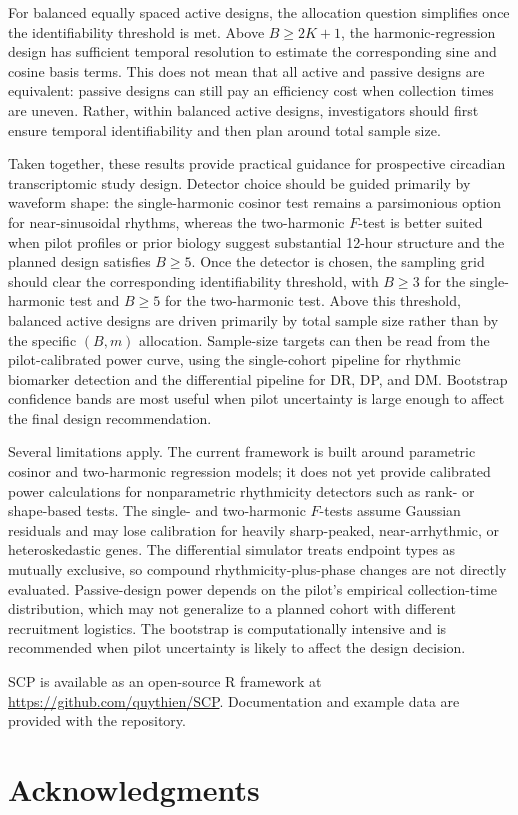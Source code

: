 \documentclass{article}
\begin{document}
For balanced equally spaced active designs, the allocation question
simplifies once the identifiability threshold is met. Above
$B \geq 2K+1$, the harmonic-regression design has sufficient temporal
resolution to estimate the corresponding sine and cosine basis terms. This
does not mean that all active and passive designs are equivalent: passive
designs can still pay an efficiency cost when collection times are uneven.
Rather, within balanced active designs, investigators should first ensure
temporal identifiability and then plan around total sample size.

Taken together, these results provide practical guidance for prospective
circadian transcriptomic study design. Detector choice should be guided
primarily by waveform shape: the single-harmonic cosinor test remains a
parsimonious option for near-sinusoidal rhythms, whereas the two-harmonic
$F$-test is better suited when pilot profiles or prior biology suggest
substantial 12-hour structure and the planned design satisfies $B \geq 5$.
Once the detector is chosen, the sampling grid should clear the
corresponding identifiability threshold, with $B \geq 3$ for the
single-harmonic test and $B \geq 5$ for the two-harmonic test. Above this
threshold, balanced active designs are driven primarily by total sample
size rather than by the specific $(B,m)$ allocation. Sample-size targets
can then be read from the pilot-calibrated power curve, using the
single-cohort pipeline for rhythmic biomarker detection and the
differential pipeline for DR, DP, and DM. Bootstrap confidence bands are
most useful when pilot uncertainty is large enough to affect the final
design recommendation.

Several limitations apply. The current framework is built around
parametric cosinor and two-harmonic regression models; it does not yet
provide calibrated power calculations for nonparametric rhythmicity
detectors such as rank- or shape-based tests. The single- and
two-harmonic $F$-tests assume Gaussian residuals and may lose calibration
for heavily sharp-peaked, near-arrhythmic, or heteroskedastic genes. The
differential simulator treats endpoint types as mutually exclusive, so
compound rhythmicity-plus-phase changes are not directly evaluated.
Passive-design power depends on the pilot's empirical collection-time
distribution, which may not generalize to a planned cohort with different
recruitment logistics. The bootstrap is computationally intensive and is
recommended when pilot uncertainty is likely to affect the design
decision.



\textsc{SCP} is available as an open-source R framework at \url{https://github.com/quythien/SCP}. Documentation and example data are provided with the repository.


\section*{Acknowledgments}



\end{document}
